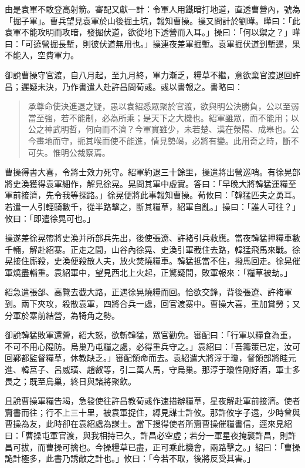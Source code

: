由是袁軍不敢登高射箭。審配又獻一計：令軍人用鐵暗打地道，直透曹營內，號為「掘子軍」。曹兵望見袁軍於山後掘土坑，報知曹操。操又問計於劉曄。曄曰：「此袁軍不能攻明而攻暗，發掘伏道，欲從地下透營而入耳。」操曰：「何以禦之？」曄曰：「可遶營掘長塹，則彼伏道無用也。」操連夜差軍掘塹。袁軍掘伏道到塹邊，果不能入，空費軍力。

卻說曹操守官渡，自八月起，至九月終，軍力漸乏，糧草不繼，意欲棄官渡退回許昌；遲疑未決，乃作書遣人赴許昌問荀彧。彧以書報之。書略曰：

\begin{quote}
承尊命使決進退之疑，愚以袁紹悉眾聚於官渡，欲與明公決勝負，公以至弱當至強，若不能制，必為所乘；是天下之大機也。紹軍雖眾，而不能用；以公之神武明哲，何向而不濟？今軍實雖少，未若楚、漢在滎陽、成皋也。公今畫地而守，扼其喉而使不能進，情見勢竭，必將有變。此用奇之時，斷不可失。惟明公裁察焉。
\end{quote}

曹操得書大喜，令將士效力死守。紹軍約退三十餘里，操遣將出營巡哨。有徐晃部將史渙獲得袁軍細作，解見徐晃。晃問其軍中虛實。答曰：「早晚大將韓猛運糧至軍前接濟，先令我等探路。」徐晃便將此事報知曹操。荀攸曰：「韓猛匹夫之勇耳。若遣一人引輕騎數千，從半路擊之，斷其糧草，紹軍自亂。」操曰：「誰人可往？」攸曰：「即遣徐晃可也。」

操遂差徐晃帶將史渙并所部兵先出，後使張遼、許褚引兵救應。當夜韓猛押糧車數千輛，解赴紹寨。正走之間，山谷內徐晃、史渙引軍截住去路，韓猛飛馬來戰。徐晃接住廝殺，史渙便殺散人夫，放火焚燒糧車。韓猛抵當不住，撥馬回走。徐晃催軍燒盡輜重。袁紹軍中，望見西北上火起，正驚疑間，敗軍報來：「糧草被劫。」

紹急遣張郃、高覽去截大路，正遇徐晃燒糧而回。恰欲交鋒，背後張遼、許褚軍到。兩下夾攻，殺散袁軍，四將合兵一處，回官渡寨中。曹操大喜，重加賞勞；又分軍於寨前結營，為犄角之勢。

卻說韓猛敗軍還營，紹大怒，欲斬韓猛，眾官勸免。審配曰：「行軍以糧食為重，不可不用心隄防。烏巢乃屯糧之處，必得重兵守之。」袁紹曰：「吾籌策已定，汝可回鄴都監督糧草，休教缺乏。」審配領命而去。袁紹遣大將淳于瓊，督領部將眭元進、韓莒子、呂威璜、趙叡等，引二萬人馬，守烏巢。那淳于瓊性剛好酒，軍士多畏之；既至烏巢，終日與諸將聚飲。

且說曹操軍糧告竭，急發使往許昌教荀彧作速措辦糧草，星夜解赴軍前接濟。使者齎書而往；行不上三十里，被袁軍捉住，縛見謀士許攸。那許攸字子遠，少時曾與曹操為友，此時卻在袁紹處為謀士。當下搜得使者所齎曹操催糧書信，逕來見紹曰：「曹操屯軍官渡，與我相持已久，許昌必空虛；若分一軍星夜掩襲許昌，則許昌可拔，而曹操可擒也。今操糧草已盡，正可乘此機會，兩路擊之。」紹曰：「曹操詭計極多，此書乃誘敵之計也。」攸曰：「今若不取，後將反受其害。」

